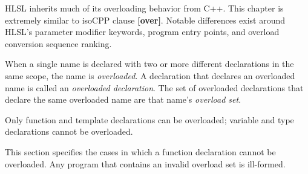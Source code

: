 
\begin{note}
\p HLSL inherits much of its overloading behavior from C++. This chapter is
extremely similar to \gls{isoCPP} clause \textbf{[over]}. Notable differences
exist around HLSL's parameter modifier keywords, program entry points, and
overload conversion sequence ranking.
\end{note}

\p When a single name is declared with two or more different declarations in the
same scope, the name is \textit{overloaded}. A declaration that declares an
overloaded name is called an \textit{overloaded declaration}. The set of
overloaded declarations that declare the same overloaded name are that name's
\textit{overload set}.

\p Only function and template declarations can be overloaded; variable and type
declarations cannot be overloaded.


\p This section specifies the cases in which a function declaration cannot be
overloaded. Any program that contains an invalid overload set is ill-formed.

